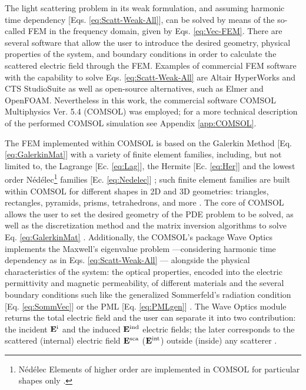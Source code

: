 
The light scattering problem in its weak formulation, and assuming harmonic time dependency [Eqs. \eqref{eq:Scatt-Weak-All}], can be solved by means of the so-called FEM in the frequency domain, given by Eqs. \eqref{eq:Vec-FEM}. There are several software that allow the user to introduce the desired geometry, physical properties of the system, and boundary conditions in order to calculate the scattered electric field through the FEM. Examples of commercial FEM software with the capability to solve Eqs. \eqref{eq:Scatt-Weak-All} are Altair HyperWorks and CTS StudioSuite as well as open-source alternatives, such as Elmer and OpenFOAM. Nevertheless in this work, the commercial software COMSOL Multiphysics\texttrademark{} Ver. 5.4 (COMSOL) was employed; for a more technical description of the performed COMSOL simulation see Appendix \ref{app:COMSOL}.

The FEM implemented within COMSOL is based on the Galerkin Method [Eq. \eqref{eq:GalerkinMat}] with a variety of finite element families, including, but not limited to, the Lagrange [Ec. \eqref{eq:Lag}], the Hermite [Ec. \eqref{eq:Her}] and the lowest order Nédélec\footnote{Nédélec Elements of higher order are implemented in COMSOL for particular shapes only \cite{comsol_doc}.} families [Ec. \eqref{eq:Nedelec}] \cite{comsol_doc}; such finite element families are built within COMSOL for different shapes in 2D and 3D geometries: triangles, rectangles, pyramids,  prisms, tetrahedrons, and more \cite{comsol_doc}. The core of COMSOL allows the user to set the desired geometry of the PDE problem to be solved, as well as the discretization method and the matrix inversion algorithms to solve Eq. \eqref{eq:GalerkinMat} \cite{comsol_doc}. Additionally, the COMSOL's package Wave Optics implements the Maxwell's eigenvalue problem ---considering harmonic time dependency as in Eqs. \eqref{eq:Scatt-Weak-All} \cite{comsol_doc}--- alongside the physical characteristics of the system: the optical properties, encoded into the electric permittivity and magnetic permeability, of different materials and the several boundary conditions such like the generalized Sommerfeld's radiation condition [Eq. \eqref{eq:SommVec}] or the PML [Eq. \eqref{eq:PMLgen}] \cite{comsol_wave}. The Wave Optics module returns the total electric field and the user can separate it into two contribution: the incident  $\vb{E}^\text{i}$ and the induced  $\vb{E}^\text{ind}$ electric fields; the later corresponds to the scattered (internal) electric field  $\vb{E}^\text{sca}$ ($\vb{E}^\text{int}$) outside (inside) any scatterer \cite{comsol_wave}.

